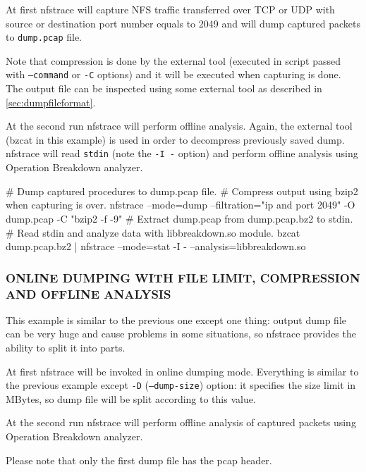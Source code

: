 \documentclass{article}
\newcommand*{\textfile}[1]{\textsf{#1}}
\newcommand*{\textprog}[1]{\textfile{#1}}
\newcommand{\code}[1]{\texttt{#1}}
\begin{document}
At first \textprog{nfstrace} will capture \gls{NFS} traffic transferred over TCP or UDP
with source or destination port number equals to 2049 and will dump captured
packets to \code{dump.pcap} file.

Note that compression is done by the external tool (executed in script passed
with \code{--command} or \code{-C}  options) and it will be executed when
capturing is done.  The output file can be inspected using some external tool
as described in \ref{sec:dumpfileformat}.

At the second run \textprog{nfstrace} will perform offline analysis. Again, the external
tool (bzcat in this example) is used in order to decompress previously saved
dump. \textprog{nfstrace} will read \code{stdin} (note the \code{-I -} option) and perform offline
analysis using Operation Breakdown analyzer.

\begin{CodeListing}
\# Dump captured procedures to dump.pcap file.
\# Compress output using bzip2 when capturing is over. 
nfstrace --mode=dump
         --filtration="ip and port 2049"
         -O dump.pcap
         -C "bzip2 -f -9"
\# Extract dump.pcap from dump.pcap.bz2 to stdin.
\# Read stdin and analyze data with libbreakdown.so module. 
bzcat dump.pcap.bz2 | nfstrace --mode=stat
                               -I -
                               --analysis=libbreakdown.so
\end{CodeListing}

\subsubsection{ONLINE DUMPING WITH FILE LIMIT, COMPRESSION AND OFFLINE ANALYSIS}

This example is similar to the previous one except one thing: output dump file
can be very huge and cause problems in some situations, so \textprog{nfstrace} provides
the ability to split it into parts.

At first \textprog{nfstrace} will be invoked in online dumping mode. Everything is similar
to the previous example except \code{-D} (\code{--dump-size}) option: it specifies the size
limit in MBytes, so dump file will be split according to this value.

At the second run \textprog{nfstrace} will perform offline analysis of captured packets
using Operation Breakdown analyzer.

Please note that only the first dump file has the pcap header.
\end{document}
